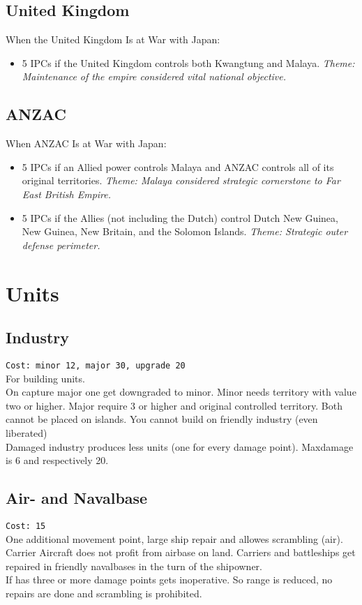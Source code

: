 \documentclass[10pt,a4paper,landscape]{article}
\begin{document}
\begin{multicols*}{3}
\subsection*{United Kingdom}
When the United Kingdom Is at War with Japan:
\begin{itemize}
\item 5 IPCs if the United Kingdom controls both Kwangtung
and Malaya. \textsl{Theme: Maintenance of the empire considered vital national objective.}
\end{itemize}

\subsection*{ANZAC}
When ANZAC Is at War with Japan:
\begin{itemize}
\item 5 IPCs if an Allied power controls Malaya and ANZAC controls all of its original territories. \textsl{Theme: Malaya considered strategic cornerstone to Far East British Empire.}
\item 5 IPCs if the Allies (not including the Dutch) control Dutch New Guinea, New Guinea, New Britain, and the Solomon Islands. \textsl{Theme: Strategic outer defense perimeter.}
\end{itemize}
\pagebreak

\section*{Units}
\subsection*{Industry}
\texttt{Cost: minor 12, major 30, upgrade 20}\\
For building units.\\
On capture major one get downgraded to minor.
Minor needs territory with value two or higher. Major require 3 or higher and original controlled territory. Both cannot be placed on islands. You cannot build on friendly industry (even liberated)\\
Damaged industry produces less units (one for every damage point). Maxdamage is 6 and respectively 20.

\subsection*{Air- and Navalbase}
\texttt{Cost: 15}\\
One additional movement point, large ship repair and allowes scrambling (air).\\
Carrier Aircraft does not profit from airbase on land. Carriers and battleships get repaired in friendly navalbases in the turn of the shipowner.
\\
If has three or more damage points gets inoperative. So range is reduced, no repairs are done and scrambling is prohibited.


\end{multicols*}
\end{document}
